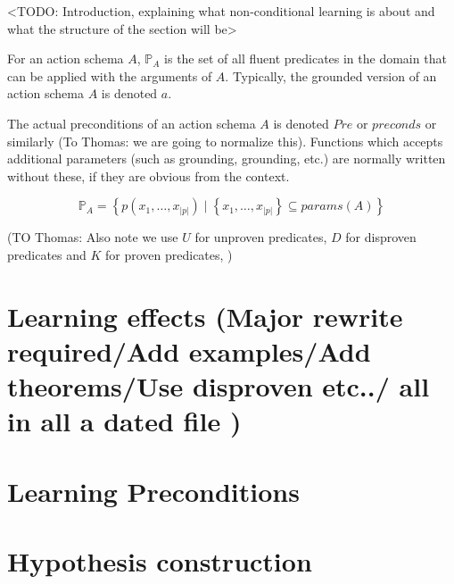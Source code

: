 \documentclass[Master.tex]{subfiles}
\begin{document}
<TODO: Introduction, explaining what non-conditional learning is about and what the structure of the section will be>

For an action schema $A$, $\mathbb{P}_A$ is the set of all fluent predicates in the domain that can be applied with the arguments of $A$. Typically, the grounded version of an action schema $A$ is denoted $a$.

The actual preconditions of an action schema $A$ is denoted $Pre$ or $preconds$ or similarly (To Thomas: we are going to normalize this). Functions which accepts additional parameters (such as grounding, grounding, etc.) are normally written without these, if they are obvious from the context.

\[
\mathbb{P}_A = \left\{
p \left( x_1, \dots, x_{|p|} \right)
\; | \; \left\{ x_1, \dots, x_{|p|} \right\} \subseteq params(A)
\right\}
\]


(TO Thomas: Also note we use $U$ for unproven predicates, $D$ for disproven predicates and $K$ for proven predicates, )

\section{Learning effects (Major rewrite required/Add examples/Add theorems/Use disproven etc../ all in all a dated file )}
    

\section{Learning Preconditions}
    

\section{Hypothesis construction}
	
\end{document}
